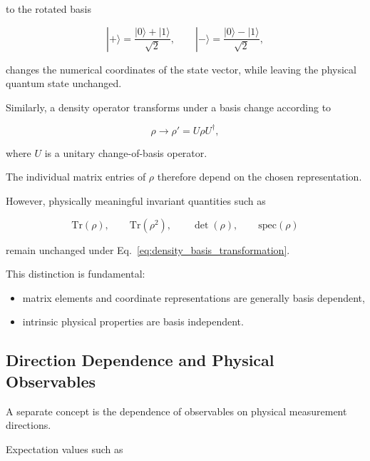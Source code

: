 to the rotated basis

\[
|+\rangle
=
\frac{|0\rangle+|1\rangle}{\sqrt{2}},
\qquad
|-\rangle
=
\frac{|0\rangle-|1\rangle}{\sqrt{2}},
\]

changes the numerical coordinates of the state vector, while leaving the physical quantum state unchanged.

\medskip

Similarly, a density operator transforms under a basis change according to

\begin{equation}
\rho
\rightarrow
\rho'
=
U \rho U^\dagger,
\label{eq:density_basis_transformation}
\end{equation}

where \( U \) is a unitary change-of-basis operator.

The individual matrix entries of \( \rho \) therefore depend on the chosen representation.

However, physically meaningful invariant quantities such as

\[
\mathrm{Tr}(\rho),
\qquad
\mathrm{Tr}(\rho^2),
\qquad
\det(\rho),
\qquad
\text{spec}(\rho)
\]

remain unchanged under Eq.~\eqref{eq:density_basis_transformation}.

\medskip

This distinction is fundamental:

\begin{itemize}

\item matrix elements and coordinate representations are generally basis dependent,

\item intrinsic physical properties are basis independent.

\end{itemize}


\subsection*{Direction Dependence and Physical Observables}

A separate concept is the dependence of observables on physical measurement directions.

Expectation values such as

